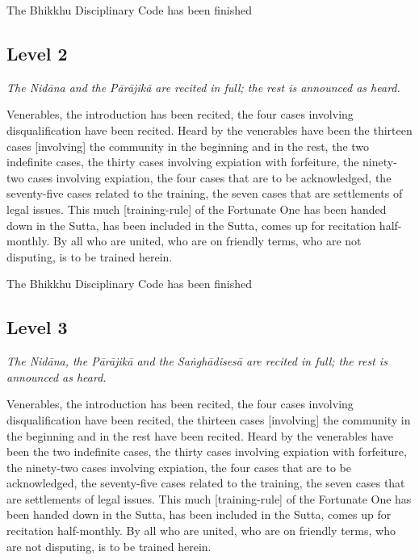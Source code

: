 \begin{outro}
	The Bhikkhu Disciplinary Code has been finished
\end{outro}

{}
\subsection*{Level 2}
\label{in-brief-english-level2}

\textit{The Nidāna and the Pārājikā are recited in full; the rest is announced as heard.}

\smallskip

Venerables, the introduction has been recited, the four cases involving disqualification have been recited. Heard by the venerables have been the thirteen cases [involving] the community in the beginning and in the rest, the two indefinite cases, the thirty cases involving expiation with forfeiture, the ninety-two cases involving expiation, the four cases that are to be acknowledged, the seventy-five cases related to the training, the seven cases that are settlements of legal issues. This much [training-rule] of the Fortunate One has been handed down in the Sutta, has been included in the Sutta, comes up for recitation half-monthly. By all who are united, who are on friendly terms, who are not disputing, is to be trained herein.

\begin{outro}
	The Bhikkhu Disciplinary Code has been finished
\end{outro}

{}
\subsection*{Level 3}
\label{in-brief-english-level3}

\textit{The Nidāna, the Pārājikā and the Saṅghādisesā are recited in full; the rest is announced as heard.}

\smallskip

Venerables, the introduction has been recited, the four cases involving disqualification have been recited, the thirteen cases [involving] the community in the beginning and in the rest have been recited. Heard by the venerables have been the two indefinite cases, the thirty cases involving expiation with forfeiture, the ninety-two cases involving expiation, the four cases that are to be acknowledged, the seventy-five cases related to the training, the seven cases that are settlements of legal issues. This much [training-rule] of the Fortunate One has been handed down in the Sutta, has been included in the Sutta, comes up for recitation half-monthly. By all who are united, who are on friendly terms, who are not disputing, is to be trained herein.

